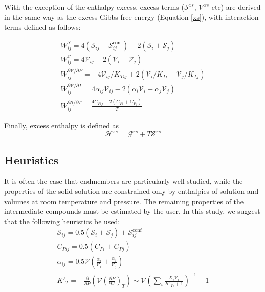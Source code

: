 \documentclass[review]{elsarticle}
\begin{document}
With the exception of the enthalpy excess, excess terms ($\mathcal{S}^{xs}$, $\mathcal{V}^{xs}$ etc) are derived in the same way as the excess Gibbs free energy (Equation \ref{xs}), with interaction terms defined as follows:

\begin{eqnarray}
  W^{\mathcal{S}}_{ij} = 4 (\mathcal{S}_{ij} - \mathcal{S}^{\textrm{conf}}_{ij}) - 2(\mathcal{S}_i + \mathcal{S}_j) \\
  W^{\mathcal{V}}_{ij} = 4 \mathcal{V}_{ij} - 2(\mathcal{V}_i + \mathcal{V}_j) \\
  W^{\partial\mathcal{V}/\partial P}_{ij} = -4 \mathcal{V}_{ij}/K_{T{ij}} + 2(\mathcal{V}_{i}/K_{T{i}} + \mathcal{V}_{j}/K_{T{j}}) \\
  W^{\partial\mathcal{V}/\partial T}_{ij} = 4 \alpha_{ij} \mathcal{V}_{ij} - 2(\alpha_{i} \mathcal{V}_i + \alpha_{j} \mathcal{V}_j) \\
  W^{\partial\mathcal{S}/\partial T}_{ij} = \frac{4 C_{P{ij}} - 2(C_{P{i}} + C_{P{j}})}{T} 
\end{eqnarray}

Finally, excess enthalpy is defined as
\begin{equation}
 \mathcal{H}^{xs} = \mathcal{G}^{xs} + T\mathcal{S}^{xs}
\end{equation}

\subsection{Heuristics}
It is often the case that endmembers are particularly well studied, while the properties of the solid solution are constrained only by enthalpies of solution and volumes at room temperature and pressure. The remaining properties of the intermediate compounds must be estimated by the user. In this study, we suggest that the following heuristics be used:
\begin{eqnarray}
  \mathcal{S}_{ij} = 0.5(\mathcal{S}_i + \mathcal{S}_j) + \mathcal{S}^{\textrm{conf}}_{ij} \\
  C_{P{ij}} = 0.5(C_{P{i}} + C_{P{j}}) \\
  \alpha_{ij} = 0.5 \mathcal{V} \left(\frac{\alpha_i}{\mathcal{V}_i} + \frac{\alpha_j}{\mathcal{V}_j}\right)\\
  K'_{T} = -\frac{\partial}{\partial P} \left (\mathcal{V}\left( \frac{\partial P}{\partial \mathcal{V}} \right)_T \right) \sim \mathcal{V} \left(\sum_i \frac{X_i \mathcal{V}_i}{K'_{Ti} + 1} \right)^{-1} - 1
\end{eqnarray}
\end{document}

